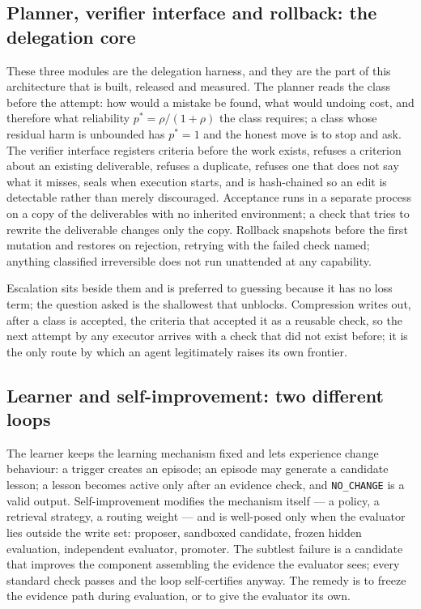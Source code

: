 \documentclass[11pt]{article}
\theoremstyle{definition}
\begin{document}
\subsection{Planner, verifier interface and rollback: the delegation core}

These three modules are the delegation harness, and they are the part of this architecture that is built, released and measured. The planner reads the class before the attempt: how would a mistake be found, what would undoing cost, and therefore what reliability $p^{*} = \rho/(1+\rho)$ the class requires; a class whose residual harm is unbounded has $p^{*}=1$ and the honest move is to stop and ask. The verifier interface registers criteria before the work exists, refuses a criterion about an existing deliverable, refuses a duplicate, refuses one that does not say what it misses, seals when execution starts, and is hash-chained so an edit is detectable rather than merely discouraged. Acceptance runs in a separate process on a copy of the deliverables with no inherited environment; a check that tries to rewrite the deliverable changes only the copy. Rollback snapshots before the first mutation and restores on rejection, retrying with the failed check named; anything classified irreversible does not run unattended at any capability.

Escalation sits beside them and is preferred to guessing because it has no loss term; the question asked is the shallowest that unblocks. Compression writes out, after a class is accepted, the criteria that accepted it as a reusable check, so the next attempt by any executor arrives with a check that did not exist before; it is the only route by which an agent legitimately raises its own frontier.

\subsection{Learner and self-improvement: two different loops}

The learner keeps the learning mechanism fixed and lets experience change behaviour: a trigger creates an episode; an episode may generate a candidate lesson; a lesson becomes active only after an evidence check, and \texttt{NO\_CHANGE} is a valid output. Self-improvement modifies the mechanism itself --- a policy, a retrieval strategy, a routing weight --- and is well-posed only when the evaluator lies outside the write set: proposer, sandboxed candidate, frozen hidden evaluation, independent evaluator, promoter. The subtlest failure is a candidate that improves the component assembling the evidence the evaluator sees; every standard check passes and the loop self-certifies anyway. The remedy is to freeze the evidence path during evaluation, or to give the evaluator its own.
\end{document}
